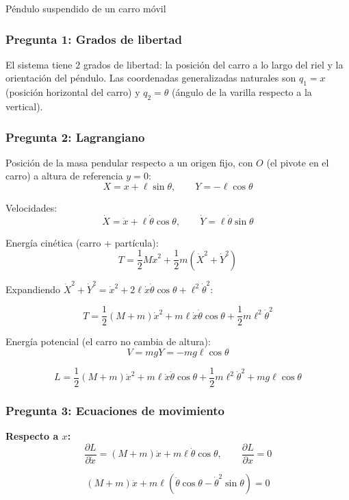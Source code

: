 \begin{solucion}{Péndulo suspendido de un carro móvil}
\subsubsection*{Pregunta 1: Grados de libertad}

El sistema tiene $2$ grados de libertad: la posición del carro a lo largo del riel y la orientación del péndulo. Las coordenadas generalizadas naturales son $q_1 = x$ (posición horizontal del carro) y $q_2 = \theta$ (ángulo de la varilla respecto a la vertical).

\subsubsection*{Pregunta 2: Lagrangiano}

Posición de la masa pendular respecto a un origen fijo, con $O$ (el pivote en el carro) a altura de referencia $y=0$:
$$X = x + \ell\sin\theta, \qquad Y = -\ell\cos\theta$$

Velocidades:
$$\dot{X} = \dot{x} + \ell\dot\theta\cos\theta, \qquad \dot{Y} = \ell\dot\theta\sin\theta$$

Energía cinética (carro + partícula):
$$T = \frac{1}{2}M\dot{x}^2 + \frac{1}{2}m\left(\dot{X}^2+\dot{Y}^2\right)$$

Expandiendo $\dot{X}^2+\dot{Y}^2 = \dot{x}^2 + 2\ell\dot{x}\dot\theta\cos\theta + \ell^2\dot\theta^2$:

$$T = \frac{1}{2}(M+m)\dot{x}^2 + m\ell\dot{x}\dot\theta\cos\theta + \frac{1}{2}m\ell^2\dot\theta^2$$

Energía potencial (el carro no cambia de altura):
$$V = mgY = -mg\ell\cos\theta$$

$$\boxed{L = \frac{1}{2}(M+m)\dot{x}^2 + m\ell\dot{x}\dot\theta\cos\theta + \frac{1}{2}m\ell^2\dot\theta^2 + mg\ell\cos\theta}$$

\subsubsection*{Pregunta 3: Ecuaciones de movimiento}

\textbf{Respecto a $x$:}
$$\frac{\partial L}{\partial\dot{x}} = (M+m)\dot{x} + m\ell\dot\theta\cos\theta, \qquad \frac{\partial L}{\partial x} = 0$$

$$\boxed{(M+m)\ddot{x} + m\ell\left(\ddot\theta\cos\theta - \dot\theta^2\sin\theta\right) = 0}$$


\end{solucion}
